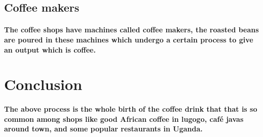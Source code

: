 \documentclass[12pt]{report}
\begin{document}
\subsection{Coffee makers }
\paragraph{The coffee shops have machines called coffee makers, the roasted beans are poured in these machines which undergo a certain process to give an output which is coffee.}

\section{Conclusion}
\paragraph{The above process is the whole birth of the coffee drink that that is so common among shops like good African coffee in lugogo, café javas around town, and some popular restaurants in Uganda.}
\end{document}
